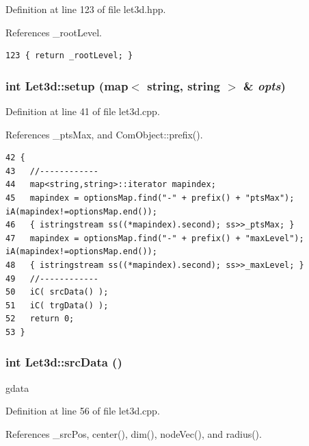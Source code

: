 Definition at line 123 of file let3d.hpp.

References \_\-root\-Level.

\footnotesize\begin{verbatim}123 { return _rootLevel; }
\end{verbatim}\normalsize 


\subsubsection{\setlength{\rightskip}{0pt plus 5cm}int Let3d::setup (map$<$ string, string $>$ \& {\em opts})}\label{classLet3d_d134e155a30bcbea9ad038ffcd737ddc_d134e155a30bcbea9ad038ffcd737ddc}




Definition at line 41 of file let3d.cpp.

References \_\-pts\-Max, and Com\-Object::prefix().

\footnotesize\begin{verbatim}42 {
43   //------------
44   map<string,string>::iterator mapindex;
45   mapindex = optionsMap.find("-" + prefix() + "ptsMax"); iA(mapindex!=optionsMap.end());
46   { istringstream ss((*mapindex).second); ss>>_ptsMax; }
47   mapindex = optionsMap.find("-" + prefix() + "maxLevel"); iA(mapindex!=optionsMap.end());
48   { istringstream ss((*mapindex).second); ss>>_maxLevel; }
49   //------------
50   iC( srcData() );
51   iC( trgData() );
52   return 0;
53 }
\end{verbatim}\normalsize 


\subsubsection{\setlength{\rightskip}{0pt plus 5cm}int Let3d::src\-Data ()}\label{classLet3d_44ef9057a3adc0372c2569c172064dac_44ef9057a3adc0372c2569c172064dac}


gdata 

Definition at line 56 of file let3d.cpp.

References \_\-src\-Pos, center(), dim(), node\-Vec(), and radius().

